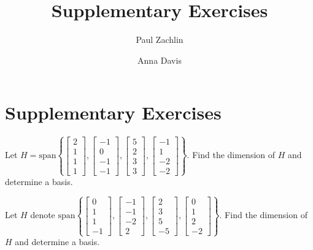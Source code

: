 \documentclass{ximera}
\author{Paul Zachlin \and Anna Davis} \title{Supplementary Exercises} \license{CC-BY 4.0}
\begin{document}
\begin{abstract}
\end{abstract}
\maketitle

\section*{Supplementary Exercises}

\begin{problem}\label{prb:5.1} Let $H = \mbox{span}\left\{ \left[
\begin{array}{r}
2 \\
1 \\
1 \\
1
\end{array}
\right] ,\left[
\begin{array}{r}
-1 \\
0 \\
-1 \\
-1
\end{array}
\right] ,\left[
\begin{array}{r}
5 \\
2 \\
3 \\
3
\end{array}
\right] ,\left[
\begin{array}{r}
-1 \\
1 \\
-2 \\
-2
\end{array}
\right] \right\} .$ Find the dimension of $H$ and determine a basis.
\end{problem}


\begin{problem}\label{prb:5.2} Let $H$ denote $\mbox{span}\left\{ \left[
\begin{array}{r}
0 \\
1 \\
1 \\
-1
\end{array}
\right] ,\left[
\begin{array}{r}
-1 \\
-1 \\
-2 \\
2
\end{array}
\right] ,\left[
\begin{array}{r}
2 \\
3 \\
5 \\
-5
\end{array}
\right] ,\left[
\begin{array}{r}
0 \\
1 \\
2 \\
-2
\end{array}
\right] \right\} .$ Find the dimension of $H$ and determine a basis.
\end{problem}
\end{document}
